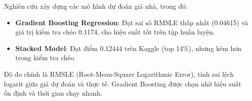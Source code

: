 Nghiên cứu xây dựng các mô hình dự đoán giá nhà, trong đó:
\begin{itemize}
    \item \textbf{Gradient Boosting Regression}: Đạt sai số RMSLE thấp nhất (0.04615) và giá trị kiểm tra chéo 0.1174, cho hiệu suất tốt trên tập huấn luyện.
    \item \textbf{Stacked Model}: Đạt điểm 0.12444 trên Kaggle (top 14\%), nhưng kém hơn trong kiểm tra chéo.
\end{itemize}
Độ đo chính là RMSLE (Root-Mean-Square Logarithmic Error), tính sai lệch logarit giữa giá dự đoán và thực tế. Gradient Boosting được chọn nhờ hiệu suất ổn định và thời gian chạy nhanh.